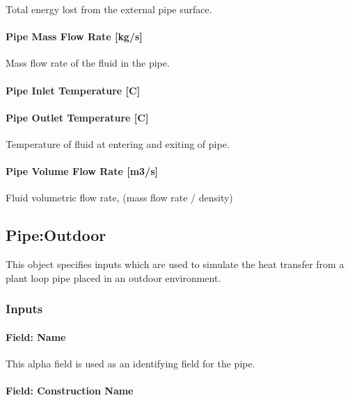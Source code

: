 Total energy lost from the external pipe surface.

\paragraph{Pipe Mass Flow Rate {[}kg/s{]}}\label{pipe-mass-flow-rate-kgs}

Mass flow rate of the fluid in the pipe.

\paragraph{Pipe Inlet Temperature {[}C{]}}\label{pipe-inlet-temperature-c}

\paragraph{Pipe Outlet Temperature {[}C{]}}\label{pipe-outlet-temperature-c}

Temperature of fluid at entering and exiting of pipe.

\paragraph{Pipe Volume Flow Rate {[}m3/s{]}}\label{pipe-volume-flow-rate-m3s}

Fluid volumetric flow rate, (mass flow rate / density)

\subsection{Pipe:Outdoor}\label{pipeoutdoor}

This object specifies inputs which are used to simulate the heat transfer from a plant loop pipe placed in an outdoor environment.

\subsubsection{Inputs}\label{inputs-7-014}

\paragraph{Field: Name}\label{field-name-7-010}

This alpha field is used as an identifying field for the pipe.

\paragraph{Field: Construction Name}\label{field-construction-name-1-000}

